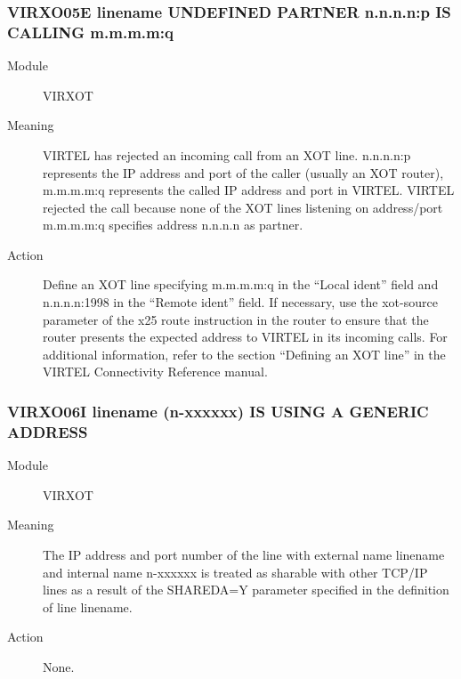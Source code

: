 \documentclass[letterpaper,10pt,english]{sphinxmanual}
\begin{document}
\subsubsection{VIRXO05E linename UNDEFINED PARTNER n.n.n.n:p IS CALLING m.m.m.m:q}
\label{\detokenize{messages:virxo05e-linename-undefined-partner-n-n-n-n-p-is-calling-m-m-m-m-q}}\begin{description}
\item[{Module}] \leavevmode
VIRXOT

\item[{Meaning}] \leavevmode
VIRTEL has rejected an incoming call from an XOT line. n.n.n.n:p represents the IP address and port of the caller (usually an XOT router), m.m.m.m:q represents the called IP address and port in VIRTEL. VIRTEL rejected the call because none of the XOT lines listening on address/port m.m.m.m:q specifies address n.n.n.n as partner.

\item[{Action}] \leavevmode
Define an XOT line specifying m.m.m.m:q in the “Local ident” field and n.n.n.n:1998 in the “Remote ident” field. If necessary, use the xot-source parameter of the x25 route instruction in the router to ensure that the router presents the expected address to VIRTEL in its incoming calls. For additional information, refer to the section “Defining an XOT line” in the VIRTEL Connectivity Reference manual.

\end{description}


\subsubsection{VIRXO06I linename (n-xxxxxx) IS USING A GENERIC ADDRESS}
\label{\detokenize{messages:virxo06i-linename-n-xxxxxx-is-using-a-generic-address}}\begin{description}
\item[{Module}] \leavevmode
VIRXOT

\item[{Meaning}] \leavevmode
The IP address and port number of the line with external name linename and internal name n-xxxxxx is treated as sharable with other TCP/IP lines as a result of the SHAREDA=Y parameter specified in the definition of line linename.

\item[{Action}] \leavevmode
None.

\end{description}
\end{document}
